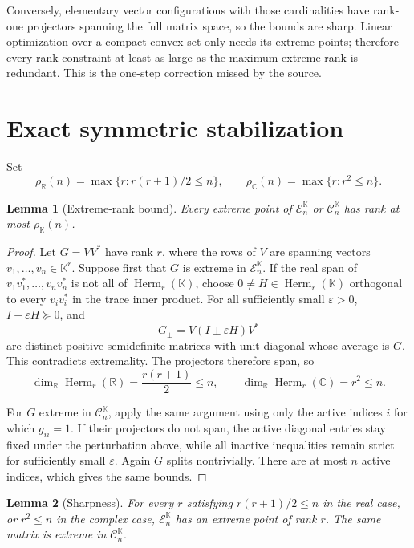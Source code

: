 \documentclass[11pt]{article}
\newtheorem{lemma}{Lemma}
\newcommand{\R}{\mathbb R}
\newcommand{\C}{\mathbb C}
\newcommand{\Ecal}{\mathcal E}
\newcommand{\Ccal}{\mathcal C}
\newcommand{\Herm}{\operatorname{Herm}}
\begin{document}
Conversely, elementary vector configurations with those cardinalities have
rank-one projectors spanning the full matrix space, so the bounds are sharp.
Linear optimization over a compact convex set only needs its extreme points;
therefore every rank constraint at least as large as the maximum extreme rank
is redundant.  This is the one-step correction missed by the source.

\section{Exact symmetric stabilization}

Set
\[
 \rho_{\R}(n)=\max\{r:r(r+1)/2\le n\},\qquad
 \rho_{\C}(n)=\max\{r:r^2\le n\}.
\]

\begin{lemma}[Extreme-rank bound]
Every extreme point of $\Ecal_n^{\mathbb K}$ or $\Ccal_n^{\mathbb K}$ has
rank at most $\rho_{\mathbb K}(n)$.
\end{lemma}

\begin{proof}
Let $G=VV^*$ have rank $r$, where the rows of $V$ are spanning vectors
$v_1,\ldots,v_n\in\mathbb K^r$.  Suppose first that $G$ is extreme in
$\Ecal_n^{\mathbb K}$.  If the real span of
$v_1v_1^*,\ldots,v_nv_n^*$ is not all of $\Herm_r(\mathbb K)$, choose
$0\ne H\in\Herm_r(\mathbb K)$ orthogonal to every $v_iv_i^*$ in the trace
inner product.  For all sufficiently small $\varepsilon>0$,
$I\pm\varepsilon H\succeq0$, and
\[
 G_{\pm}=V(I\pm\varepsilon H)V^*
\]
are distinct positive semidefinite matrices with unit diagonal whose average
is $G$.  This contradicts extremality.  The projectors therefore span, so
\[
 \dim_{\R}\Herm_r(\R)=\frac{r(r+1)}2\le n,
 \qquad
 \dim_{\R}\Herm_r(\C)=r^2\le n.
\]

For $G$ extreme in $\Ccal_n^{\mathbb K}$, apply the same argument using only
the active indices $i$ for which $g_{ii}=1$.  If their projectors do not span,
the active diagonal entries stay fixed under the perturbation above, while
all inactive inequalities remain strict for sufficiently small
$\varepsilon$.  Again $G$ splits nontrivially.  There are at most $n$ active
indices, which gives the same bounds.
\end{proof}

\begin{lemma}[Sharpness]
For every $r$ satisfying $r(r+1)/2\le n$ in the real case, or $r^2\le n$ in
the complex case, $\Ecal_n^{\mathbb K}$ has an extreme point of rank $r$.
The same matrix is extreme in $\Ccal_n^{\mathbb K}$.
\end{lemma}
\end{document}
